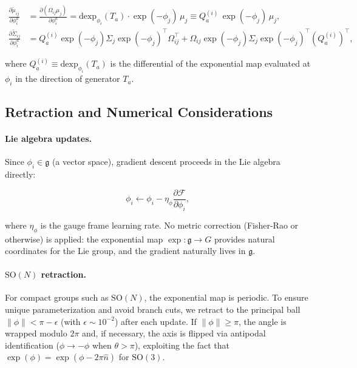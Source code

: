 \documentclass[twoside,11pt]{article}
\begin{document}
\begin{align}
\frac{\partial \tilde{\mu}_{ij}}{\partial \phi_i^a} &= \frac{\partial (\Omega_{ij}\mu_j)}{\partial \phi_i^a}
= \mathrm{dexp}_{\phi_i}(T_a) \cdot \exp(-\phi_j) \, \mu_j
\equiv Q_a^{(i)} \, \exp(-\phi_j) \, \mu_j, \label{eq:dtilde_mu} \\
\frac{\partial \tilde{\Sigma}_{ij}}{\partial \phi_i^a} &=
Q_a^{(i)} \exp(-\phi_j) \Sigma_j \exp(-\phi_j)^\top \Omega_{ij}^\top
+ \Omega_{ij} \exp(-\phi_j) \Sigma_j \exp(-\phi_j)^\top (Q_a^{(i)})^\top, \label{eq:dtilde_Sigma}
\end{align}

where $Q_a^{(i)} \equiv \mathrm{dexp}_{\phi_i}(T_a)$ is the differential of the exponential map evaluated at $\phi_i$ in the direction of generator $T_a$.

\subsection{Retraction and Numerical Considerations}

\paragraph{Lie algebra updates.} Since $\phi_i \in \mathfrak{g}$ (a vector space), gradient descent proceeds in the Lie algebra directly:

\begin{equation}
\phi_i \leftarrow \phi_i - \eta_\phi \frac{\partial \mathcal{F}}{\partial \phi_i},
\label{eq:phi_update}
\end{equation}

where $\eta_\phi$ is the gauge frame learning rate. No metric correction (Fisher-Rao or otherwise) is applied: the exponential map $\exp: \mathfrak{g} \to G$ provides natural coordinates for the Lie group, and the gradient naturally lives in $\mathfrak{g}$.

\paragraph{$\mathrm{SO}(N)$ retraction.} For compact groups such as $\mathrm{SO}(N)$, the exponential map is periodic. To ensure unique parameterization and avoid branch cuts, we retract to the principal ball $\|\phi\| < \pi - \epsilon$ (with $\epsilon \sim 10^{-2}$) after each update. If $\|\phi\| \geq \pi$, the angle is wrapped modulo $2\pi$ and, if necessary, the axis is flipped via antipodal identification ($\phi \to -\phi$ when $\theta > \pi$), exploiting the fact that $\exp(\phi) = \exp(\phi - 2\pi \hat{n})$ for $\mathrm{SO}(3)$.
\end{document}
